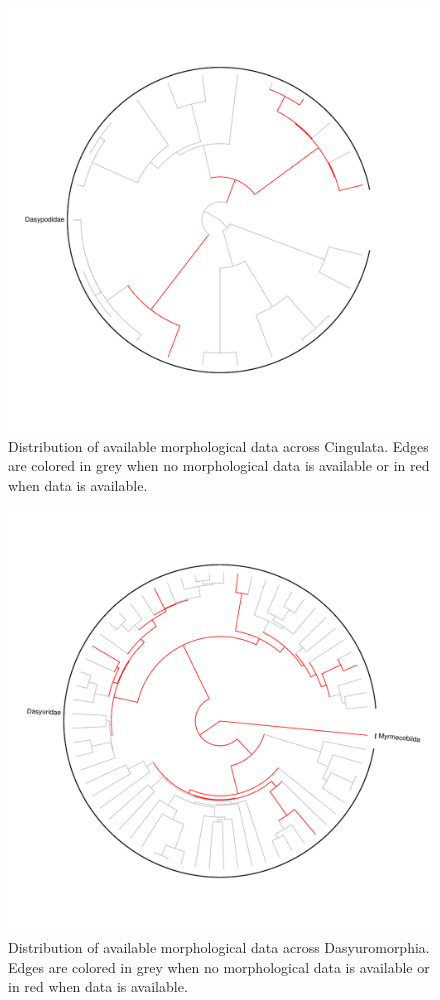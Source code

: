\begin{figure}[!htbp]
\centering
    \includegraphics[width=1\textwidth]{Supplementary/Supp_figure_CINGULATA.pdf}
\caption{Distribution of available morphological data across Cingulata. Edges are colored in grey when no morphological data is available or in red when data is available.}
\label{Supp_Figure_Phylo-Cingulata}
\end{figure}

\begin{figure}[!htbp]
\centering
    \includegraphics[width=1\textwidth]{Supplementary/Supp_figure_DASYUROMORPHIA.pdf}
\caption{Distribution of available morphological data across Dasyuromorphia. Edges are colored in grey when no morphological data is available or in red when data is available.}
\label{Supp_Figure_Phylo-Dasyuromorphia}
\end{figure}

